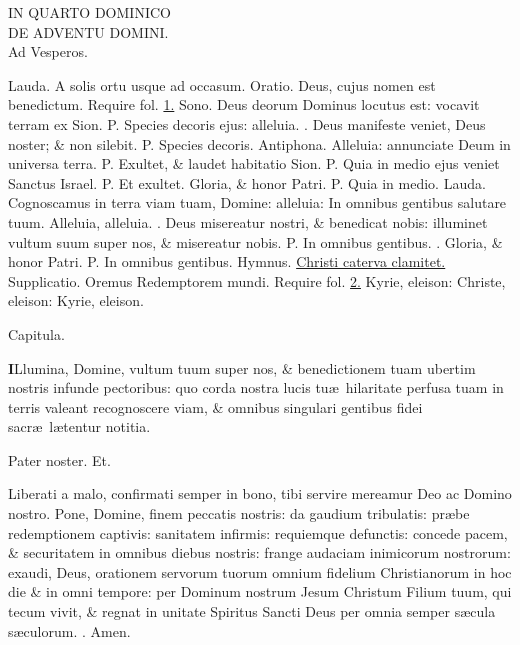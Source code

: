 \documentclass[letter,11pt]{book}
\makeatletter
\DeclareRobustCommand{\Vbar}{\vers@resp{-0.1em}{V}}
\DeclareRobustCommand{\Rbar}{\vers@resp{0pt}{R}}
\newcommand{\vers@resp@sym}{\raisebox{0.2ex}{\rotatebox[origin=c]{-20}{$\m@th\rceil$}}}
\newcommand{\vers@resp}[2]{%
  {\ooalign{\hidewidth\kern#1\vers@resp@sym\hidewidth\cr#2\cr}}%
}%
\def\P{\color{Red} P. \color{black}}
\def\V{\color{Red} \Vbar . \color{black}}
\def\R{\color{Red} \Rbar . \color{black}}
\makeatother
\begin{document}
\begin{multicols}{2}
\begin{center}
IN QUARTO DOMINICO\\
\color{black} DE ADVENTU DOMINI.\\
\color{Red} Ad Vesperos.
\end{center}
\vspace{-.75em}
\par \noindent \color{Red} Lauda. \color{black} A solis ortu usque ad occasum. \color{Red} Oratio. \color{black} Deus, cujus nomen est benedictum. \color{Red} Require fol. \color{black} \hyperlink{DOM-PRIMA-ADV}{1.}
\newline \color{Red} Sono. \color{black} Deus deorum Dominus locutus est: vocavit terram ex Sion. \P Species decoris ejus: alleluia. \V Deus manifeste veniet, Deus noster; \& non silebit. \P Species decoris.
\newline \color{Red} Antiphona. \color{black} Alleluia: annunciate Deum in universa terra. \P Exultet, \& laudet habitatio Sion. \P Quia in medio ejus veniet Sanctus Israel. \P Et exultet. Gloria, \& honor Patri. \P Quia in medio.
\newline \color{Red} Lauda. \color{black} Cognoscamus in terra viam tuam, Domine: alleluia: In omnibus gentibus salutare tuum. Alleluia, alleluia. \V Deus misereatur nostri, \& benedicat nobis: illuminet vultum suum super nos, \& misereatur nobis. \P In omnibus gentibus. \V Gloria, \& honor Patri. \P In omnibus gentibus.
\color{Red} Hymnus. \color{black} \hyperlink{hymn.Christi}{Christi caterva clamitet.} \color{Red} Supplicatio. \color{black} Oremus Redemptorem mundi. \color{Red} Require fol. \color{black} \hyperlink{page.2}{2.} Kyrie, eleison: Christe, eleison: Kyrie, eleison.
\vspace{-.5em} \begin{center} \color{Red} Capitula. \color{black} \end{center} \vspace{-.5em}
\lettrine[lines=2]{\bfseries \color{Red} I}{}Llumina, Domine, vultum tuum super nos, \& benedictionem tuam ubertim nostris infunde pectoribus: quo corda nostra lucis tu\ae \ hilaritate perfusa tuam in terris valeant recognoscere viam, \& omnibus singulari gentibus fidei sacr\ae \ l\ae tentur notitia.
\par Pater noster. Et.
\par Liberati a malo, confirmati semper in bono, tibi servire mereamur Deo ac Domino nostro. Pone, Domine, finem peccatis nostris: da gaudium tribulatis: pr\ae be redemptionem captivis: sanitatem infirmis: requiemque defunctis: concede pacem, \& securitatem in omnibus diebus nostris: frange audaciam inimicorum nostrorum: exaudi, Deus, orationem servorum tuorum omnium fidelium Christianorum in hoc die \& in omni tempore: per Dominum nostrum Jesum Christum Filium tuum, qui tecum vivit, \& regnat in unitate Spiritus Sancti Deus per omnia semper s\ae cula s\ae culorum. \R Amen.

\end{multicols}
\end{document}
